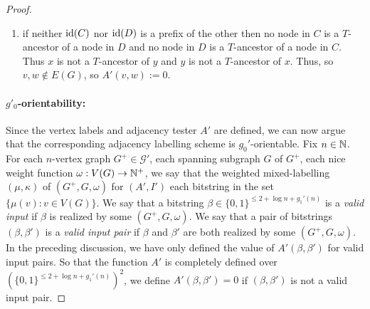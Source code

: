 \begin{proof}
\begin{enumerate}
    Thus, we only need to consider the entries $\alpha(w,u)$ whose first bit is $1$, so $\alpha(w,u)=\langle 1, \bin(\idx(C')), \rho_{C'}(x'), \mu_{x'}(A_{y'}\setminus A_{x'}), \kappa_{x'}(A_{y'}\setminus A_{x'}, u)\rangle$, where $x'$ is the home of $u$ in $\mathcal{T}$ and $C'$ is the component of $F$ that contains $x'$.  In this case, the first $\idx(C')$ parts of $\id(y)$ gives $\id(C')$.  Then $\id(x')=\id(C')\circ\rho_{C'}(x')$.  The tester first checks that $\id(x')=\id(x)$.  If not, then $x'\neq x$ and $u\neq v$ since $u\in B_{x'}\setminus A_{x'}$ and $v\in B_x\setminus A_x$. If $\id(x')=\id(x)$ then $x'=x$ since $\id$ is injective.  In this case, the tester can check if $u=v$ by checking if $I(\mu_{x'}(A_{y'}\setminus A_{x'}),\kappa_{x'}(A_{y'}\setminus A_{x'}, u), \mu_{x}(v))=1$.  If so, then $v=u\in N_G(w)$ so the tester outputs $A'(\mu(v),\mu(w)):=1$.  If not, the tester continues with the next entry (if any) in $\alpha(w)$.

    \item if neither $\operatorname{id}(C)$ nor $\operatorname{id}(D)$ is a prefix of the other then no node in $C$ is a $T$-ancestor of a node in $D$ and no node in $D$ is a $T$-ancestor of a node in $C$.  Thus $x$ is not a $T$-ancestor of $y$ and $y$ is not a $T$-ancestor of $x$.  Thus, so $v,w\not\in E(G)$, so $A'(v,w):=0$.
  \end{enumerate}

  \paragraph{\boldmath $g'_0$-orientability:}

  Since the vertex labels and adjacency tester $A'$ are defined, we can now argue that the corresponding adjacency labelling scheme is $g_0'$-orientable.  Fix $n\in\mathbb{N}$. For each $n$-vertex graph $G^+\in \mathcal{G}'$, each spanning subgraph $G$ of $G^+$, each nice weight function $\omega:V(G)\to\mathbb{N}^+$, we say that the weighted mixed-labelling $(\mu,\kappa)$ of $(G^+,G,\omega)$ for $(A',I')$  each bitstring in the set $\{\mu(v):v\in V(G)\}$.  We say that a bitstring $\beta\in\{0,1\}^{\le 2+\log n+g_1'(n)}$ is a \emph{valid input} if $\beta$ is realized by some $(G^+,G,\omega)$.  We say that a pair of bitstrings $(\beta,\beta')$ is a \emph{valid input pair} if $\beta$ and $\beta'$ are both realized by some $(G^+,G,\omega)$.  In the preceding discussion, we have only defined the value of $A'(\beta,\beta')$ for valid input pairs.  So that the function $A'$ is completely defined over $(\{0,1\}^{\le 2+\log n+g_1'(n)})^2$, we define $A'(\beta,\beta')=0$ if $(\beta,\beta')$ is not a valid input pair.


\end{proof}
